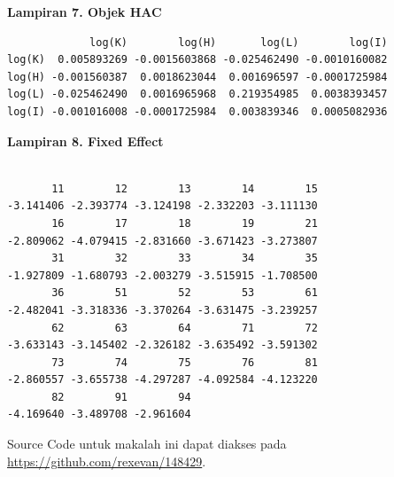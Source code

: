 \newpage

\textbf{Lampiran 7. Objek HAC}

\begin{verbatim}
             log(K)        log(H)       log(L)        log(I)
log(K)  0.005893269 -0.0015603868 -0.025462490 -0.0010160082
log(H) -0.001560387  0.0018623044  0.001696597 -0.0001725984
log(L) -0.025462490  0.0016965968  0.219354985  0.0038393457
log(I) -0.001016008 -0.0001725984  0.003839346  0.0005082936
\end{verbatim}

\textbf{Lampiran 8. Fixed Effect}

\begin{verbatim}

       11        12        13        14        15
-3.141406 -2.393774 -3.124198 -2.332203 -3.111130
       16        17        18        19        21
-2.809062 -4.079415 -2.831660 -3.671423 -3.273807
       31        32        33        34        35
-1.927809 -1.680793 -2.003279 -3.515915 -1.708500
       36        51        52        53        61
-2.482041 -3.318336 -3.370264 -3.631475 -3.239257
       62        63        64        71        72
-3.633143 -3.145402 -2.326182 -3.635492 -3.591302
       73        74        75        76        81
-2.860557 -3.655738 -4.297287 -4.092584 -4.123220
       82        91        94
-4.169640 -3.489708 -2.961604

\end{verbatim}

Source Code untuk makalah ini dapat diakses pada \href{https://github.com/rexevan/148429}{https://github.com/rexevan/148429}.
